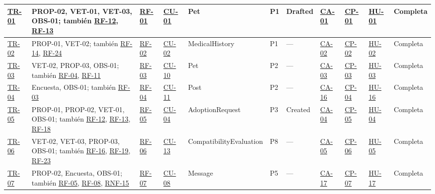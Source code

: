 \documentclass[journal,onecolumn]{IEEEtran}
\begin{document}
\begin{landscape}
\begin{longtable}{@{}p{0.8cm} p{4.0cm} p{1.3cm} p{1.7cm} p{2.5cm} p{1.0cm} p{1.9cm} p{0.9cm} p{0.9cm} p{1.75cm} p{2.2cm}@{}}
			\hyperref[tr:01]{TR-01}\label{tr:01} & PROP-02, VET-01, VET-03, OBS-01; también \hyperref[tab:RF-12]{RF-12}, \hyperref[tab:RF-13]{RF-13} & \hyperref[tab:RF-01]{RF-01} & \hyperref[tab:CU-01]{CU-01} & Pet & P1 & Drafted & \hyperref[lst:ca01]{CA-01} & \hyperref[tab:CP-01]{CP-01} & \hyperref[tab:HU-01]{HU-01} & Completa \\ \midrule
			\hyperref[tr:02]{TR-02}\label{tr:02} & PROP-01, VET-02; también \hyperref[tab:RF-14]{RF-14}, \hyperref[tab:RF-24]{RF-24} & \hyperref[tab:RF-02]{RF-02} & \hyperref[tab:CU-02]{CU-02} & MedicalHistory & P1 & --- & \hyperref[lst:ca02]{CA-02} & \hyperref[cp:02]{CP-02} & \hyperref[tab:HU-02]{HU-02} & Completa \\ \midrule
			\hyperref[tr:03]{TR-03}\label{tr:03} & VET-02, PROP-03, OBS-01; también \hyperref[tab:RF-04]{RF-04}, \hyperref[tab:RF-11]{RF-11} & \hyperref[tab:RF-03]{RF-03} & \hyperref[tab:CU-10]{CU-10} & Pet & P2 & --- & \hyperref[lst:ca03]{CA-03} & \hyperref[cp:03]{CP-03} & \hyperref[tab:HU-03]{HU-03} & Completa \\ \midrule
			\hyperref[tr:04]{TR-04}\label{tr:04} & Encuesta, OBS-01; también \hyperref[tab:RF-03]{RF-03} & \hyperref[tab:RF-04]{RF-04} & \hyperref[tab:CU-11]{CU-11} & Post & P2 & --- & \hyperref[lst:ca16]{CA-16} & \hyperref[cp:04]{CP-04} & \hyperref[tab:HU-16]{HU-16} & Completa \\ \midrule
			\hyperref[tr:05]{TR-05}\label{tr:05} & PROP-01, PROP-02, VET-01, OBS-01; también \hyperref[tab:RF-12]{RF-12}, \hyperref[tab:RF-13]{RF-13}, \hyperref[tab:RF-18]{RF-18} & \hyperref[tab:RF-05]{RF-05} & \hyperref[tab:CU-04]{CU-04} & AdoptionRequest & P3 & Created & \hyperref[lst:ca04]{CA-04} & \hyperref[cp:05]{CP-05} & \hyperref[tab:HU-04]{HU-04} & Completa \\ \midrule
			\hyperref[tr:06]{TR-06}\label{tr:06} & VET-02, VET-03, PROP-03, OBS-01; también \hyperref[tab:RF-16]{RF-16}, \hyperref[tab:RF-19]{RF-19}, \hyperref[tab:RF-23]{RF-23} & \hyperref[tab:RF-06]{RF-06} & \hyperref[tab:CU-13]{CU-13} & CompatibilityEvaluation & P8 & --- & \hyperref[lst:ca05]{CA-05} & \hyperref[cp:06]{CP-06} & \hyperref[tab:HU-05]{HU-05} & Completa \\ \midrule
			\hyperref[tr:07]{TR-07}\label{tr:07} & PROP-02, Encuesta, OBS-01; también \hyperref[tab:RF-05]{RF-05}, \hyperref[tab:RF-08]{RF-08}, \hyperref[tab:RNF-15]{RNF-15} & \hyperref[tab:RF-07]{RF-07} & \hyperref[tab:CU-08]{CU-08} & Message & P5 & --- & \hyperref[lst:ca17]{CA-17} & \hyperref[cp:07]{CP-07} & \hyperref[tab:HU-17]{HU-17} & Completa \\ \midrule

\end{longtable}
\end{landscape}
\end{document}

